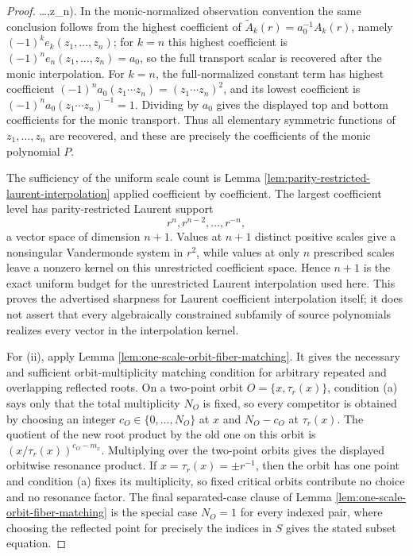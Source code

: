 \begin{proof}
\dots,z_n)\).  In the monic-normalized observation convention the same conclusion follows from the highest coefficient of \(\widetilde A_k(r)=a_0^{-1}A_k(r)\), namely \((-1)^ke_k(z_1,\dots,z_n)\); for \(k=n\) this highest coefficient is \((-1)^ne_n(z_1,\dots,z_n)=a_0\), so the full transport scalar is recovered after the monic interpolation.  For \(k=n\), the full-normalized constant term has highest coefficient \((-1)^n a_0(z_1\cdots z_n)=(z_1\cdots z_n)^2\), and its lowest coefficient is \((-1)^n a_0(z_1\cdots z_n)^{-1}=1\).  Dividing by \(a_0\) gives the displayed top and bottom coefficients for the monic transport.  Thus all elementary symmetric functions of \(z_1,
\dots,z_n\) are recovered, and these are precisely the coefficients of the monic polynomial \(P\).

The sufficiency of the uniform scale count is Lemma \ref{lem:parity-restricted-laurent-interpolation} applied coefficient by coefficient.  The largest coefficient level has parity-restricted Laurent support
\[
r^n,r^{n-2},\dots,r^{-n},
\]
a vector space of dimension \(n+1\).  Values at \(n+1\) distinct positive scales give a nonsingular Vandermonde system in \(r^2\), while values at only \(n\) prescribed scales leave a nonzero kernel on this unrestricted coefficient space.  Hence \(n+1\) is the exact uniform budget for the unrestricted Laurent interpolation used here.  This proves the advertised sharpness for Laurent coefficient interpolation itself; it does not assert that every algebraically constrained subfamily of source polynomials realizes every vector in the interpolation kernel.

For (ii), apply Lemma \ref{lem:one-scale-orbit-fiber-matching}.  It gives the necessary and sufficient orbit-multiplicity matching condition for arbitrary repeated and overlapping reflected roots.  On a two-point orbit \(O=\{x,\tau_r(x)\}\), condition \textup{(a)} says only that the total multiplicity \(N_O\) is fixed, so every competitor is obtained by choosing an integer \(c_O\in\{0,\dots,N_O\}\) at \(x\) and \(N_O-c_O\) at \(\tau_r(x)\).  The quotient of the new root product by the old one on this orbit is \((x/\tau_r(x))^{c_O-m_x}\).  Multiplying over the two-point orbits gives the displayed orbitwise resonance product.  If \(x=\tau_r(x)=\pm r^{-1}\), then the orbit has one point and condition \textup{(a)} fixes its multiplicity, so fixed critical orbits contribute no choice and no resonance factor.  The final separated-case clause of Lemma \ref{lem:one-scale-orbit-fiber-matching} is the special case \(N_O=1\) for every indexed pair, where choosing the reflected point for precisely the indices in \(S\) gives the stated subset equation.


\end{proof}
